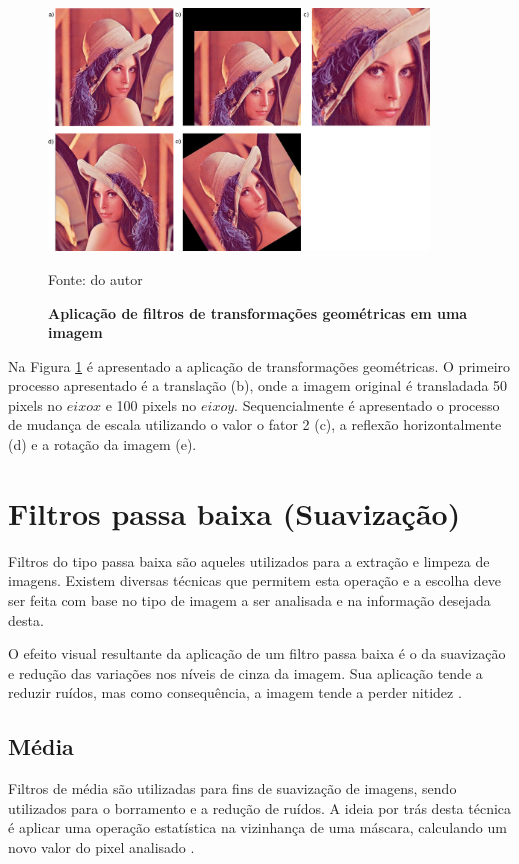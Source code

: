 \documentclass[
	12pt,				%
	oneside,			%
	a4paper,			%
	english,			%
	french,				%
	spanish,			%
	brazil,				%
	]{abntex2}
\begin{document}
\begin{figure}[ht]
\centering
\caption{\textbf{Aplicação de filtros de transformações geométricas em uma imagem}}
\includegraphics[width=0.9\textwidth]{imagens/transformacoesgeometricas.png}

Fonte: do autor
\label{fig:transformacoesgeometricas}
\end{figure}

Na Figura \ref{fig:transformacoesgeometricas} é apresentado a aplicação de transformações geométricas. O primeiro processo apresentado é a translação (b), onde a imagem original é transladada 50 pixels no \(eixo x\) e 100 pixels no \(eixo y\). Sequencialmente é apresentado o processo de mudança de escala utilizando o valor o fator 2 (c), a reflexão horizontalmente (d) e a rotação da imagem (e). 

\section{Filtros passa baixa (Suavização)}
Filtros do tipo passa baixa são aqueles utilizados para a extração e limpeza de imagens. Existem diversas técnicas que permitem esta operação e a escolha deve ser feita com base no tipo de imagem a ser analisada e na informação desejada desta. 

O efeito visual resultante da aplicação de um filtro passa baixa é o da suavização e redução das variações nos níveis de cinza da imagem. Sua aplicação tende a reduzir ruídos, mas como consequência, a imagem tende a perder nitidez \cite{conciAzevedoLeta:2008}.

\subsection{Média}
Filtros de média são utilizadas para fins de suavização de imagens, sendo utilizados para o borramento e a redução de ruídos. A ideia por trás desta técnica é aplicar uma operação estatística na vizinhança de uma máscara, calculando um novo valor do pixel analisado \cite{gonzalesWoods:2008}. 
\end{document}
